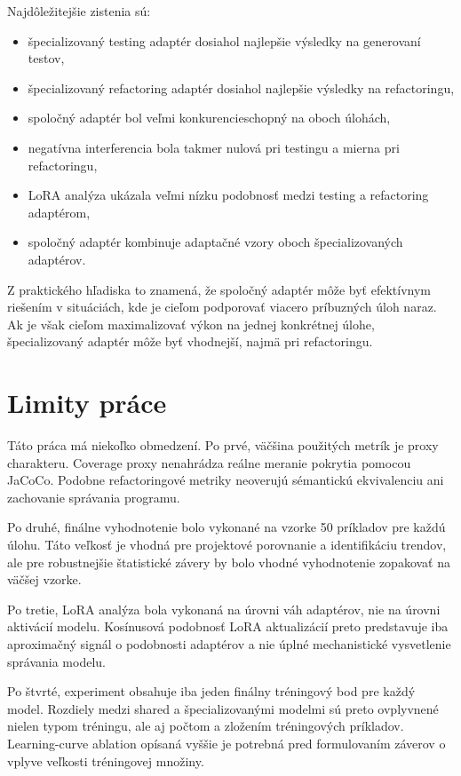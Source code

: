 \documentclass[11pt,a4paper]{article}
\begin{document}
Najdôležitejšie zistenia sú:
\begin{itemize}
\item špecializovaný testing adaptér dosiahol najlepšie výsledky na generovaní testov,
\item špecializovaný refactoring adaptér dosiahol najlepšie výsledky na refactoringu,
\item spoločný adaptér bol veľmi konkurencieschopný na oboch úlohách,
\item negatívna interferencia bola takmer nulová pri testingu a mierna pri refactoringu,
\item LoRA analýza ukázala veľmi nízku podobnosť medzi testing a refactoring adaptérom,
\item spoločný adaptér kombinuje adaptačné vzory oboch špecializovaných adaptérov.
\end{itemize}

Z praktického hľadiska to znamená, že spoločný adaptér môže byť efektívnym riešením v situáciách, kde je cieľom podporovať viacero príbuzných úloh naraz. Ak je však cieľom maximalizovať výkon na jednej konkrétnej úlohe, špecializovaný adaptér môže byť vhodnejší, najmä pri refactoringu.

\section{Limity práce}

Táto práca má niekoľko obmedzení. Po prvé, väčšina použitých metrík je proxy charakteru. Coverage proxy nenahrádza reálne meranie pokrytia pomocou JaCoCo. Podobne refactoringové metriky neoverujú sémantickú ekvivalenciu ani zachovanie správania programu.

Po druhé, finálne vyhodnotenie bolo vykonané na vzorke 50 príkladov pre každú úlohu. Táto veľkosť je vhodná pre projektové porovnanie a identifikáciu trendov, ale pre robustnejšie štatistické závery by bolo vhodné vyhodnotenie zopakovať na väčšej vzorke.

Po tretie, LoRA analýza bola vykonaná na úrovni váh adaptérov, nie na úrovni aktivácií modelu. Kosínusová podobnosť LoRA aktualizácií preto predstavuje iba aproximačný signál o podobnosti adaptérov a nie úplné mechanistické vysvetlenie správania modelu.

Po štvrté, experiment obsahuje iba jeden finálny tréningový bod pre každý
model. Rozdiely medzi shared a špecializovanými modelmi sú preto ovplyvnené
nielen typom tréningu, ale aj počtom a zložením tréningových príkladov.
Learning-curve ablation opísaná vyššie je potrebná pred formulovaním záverov
o vplyve veľkosti tréningovej množiny.
\end{document}
